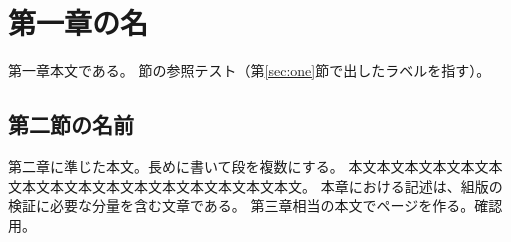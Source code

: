 \documentclass[pdflatex,tate,paper=a5]{jlreq}
\begin{document}
\tableofcontents
\chapter{第一章の名}
第一章本文である。\label{sec:one}
節の参照テスト（第\ref{sec:one}節で出したラベルを指す）。
\clearpage
\section{第二節の名前}
第二章に準じた本文。長めに書いて段を複数にする。
本文本文本文本文本文本文本文本文本文本文本文本文本文本文本文本文。
本章における記述は、組版の検証に必要な分量を含む文章である。
\clearpage
第三章相当の本文でページを作る。確認用。
\end{document}
